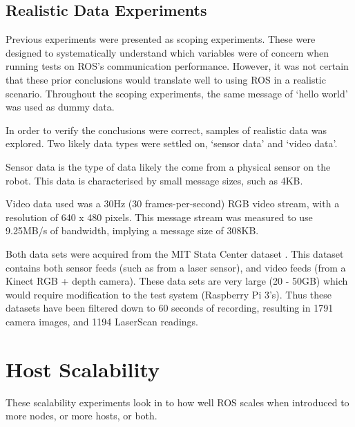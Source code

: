 \documentclass{l4proj}
\begin{document}








\section{Realistic Data Experiments}

Previous experiments were presented as scoping experiments. These were designed to systematically understand which variables were of concern when running tests on ROS's communication performance. However, it was not certain that these prior conclusions would translate well to using ROS in a realistic scenario. Throughout the scoping experiments, the same message of `hello world' was used as dummy data.

In order to verify the conclusions were correct, samples of realistic data was explored. Two likely data types were settled on, `sensor data' and `video data'.

Sensor data is the type of data likely the come from a physical sensor on the robot. This data is characterised by small message sizes, such as 4KB.

Video data used was a 30Hz (30 frames-per-second) RGB video stream, with a resolution of 640 x 480 pixels. This message stream was measured to use 9.25MB/s of bandwidth, implying a message size of 308KB.

Both data sets were acquired from the MIT Stata Center dataset \cite{mit-stata-center-dataset}. This dataset contains both sensor feeds (such as from a laser sensor), and video feeds (from a Kinect RGB + depth camera). These data sets are very large (20 - 50GB) which would require modification to the test system (Raspberry Pi 3’s). Thus these datasets have been filtered down to 60 seconds of recording, resulting in 1791 camera images, and 1194 LaserScan readings.





\chapter{Host Scalability}

These scalability experiments look in to how well ROS scales when introduced to more nodes, or more hosts, or both.
\end{document}
